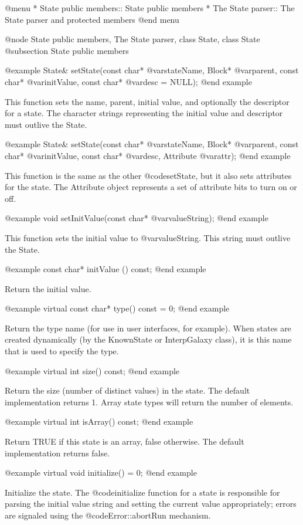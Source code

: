 @menu
* State public members::        State public members
* The State parser::            The State parser and protected members
@end menu

@node State public members, The State parser, class State, class State
@subsection State public members

@example
State& setState(const char* @var{stateName}, Block* @var{parent},
               const char* @var{initValue}, const char* @var{desc} = NULL);
@end example

This function sets the name, parent, initial value, and optionally the
descriptor for a state.  The character strings representing the initial
value and descriptor must outlive the State.

@example
State& setState(const char* @var{stateName}, Block* @var{parent},
               const char* @var{initValue}, const char* @var{desc},
               Attribute @var{attr});
@end example

This function is the same as the other @code{setState}, but it also
sets attributes for the state.  The Attribute object represents a
set of attribute bits to turn on or off.

@example
void setInitValue(const char* @var{valueString});
@end example

This function sets the initial value to @var{valueString}.  This
string must outlive the State.

@example
const char* initValue () const;
@end example

Return the initial value.

@example
virtual const char* type() const = 0;
@end example

Return the type name (for use in user interfaces, for example).
When states are created dynamically (by the KnownState or InterpGalaxy
class), it is this name that is used to specify the type.

@example
virtual int size() const;
@end example

Return the size (number of distinct values) in the state.  The
default implementation returns 1.  Array state types will return the
number of elements.

@example
virtual int isArray() const;
@end example

Return TRUE if this state is an array, false otherwise.  The default
implementation returns false.

@example
virtual void initialize() = 0;
@end example

Initialize the state.  The @code{initialize} function for a state is
responsible for parsing the initial value string and setting the current
value appropriately; errors are signaled using the
@code{Error::abortRun} mechanism.

